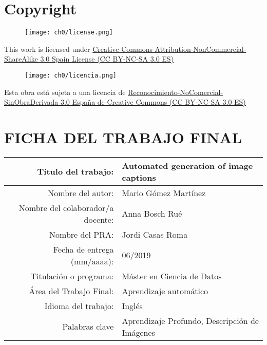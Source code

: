 \setcounter{page}{1} 
\pagestyle{plain}

\chapter*{Copyright}

\vspace{1cm}

\begin{figure}[ht]
    \centering
	\texttt{[image: ch0/license.png]}
\end{figure}

This work is licensed under \href{https://creativecommons.org/licenses/by-nc-sa/3.0/es/deed.en}{Creative Commons Attribution-NonCommercial-ShareAlike 3.0 Spain License (CC BY-NC-SA 3.0 ES)} 

\vspace{1cm}

\begin{figure}[ht]
    \centering
	\texttt{[image: ch0/licencia.png]}
\end{figure}

Esta obra está sujeta a una licencia de \href{https://creativecommons.org/licenses/by-nc-sa/3.0/es/}{Reconocimiento-NoComercial-SinObraDerivada 3.0 España de Creative Commons (CC BY-NC-SA 3.0 ES)}


\chapter*{FICHA DEL TRABAJO FINAL}

\begin{table}[ht]
	\centering{}
	\renewcommand{\arraystretch}{2}
	\begin{tabular}{r | l}
		\hline
		Título del trabajo: & Automated generation of image captions\\
		\hline
        Nombre del autor: & Mario Gómez Martínez\\
		\hline
        Nombre del colaborador/a docente: & Anna Bosch Rué\\
		\hline
        Nombre del PRA: & Jordi Casas Roma\\
		\hline
        Fecha de entrega (mm/aaaa): & 06/2019\\
		\hline
        Titulación o programa: & Máster en Ciencia de Datos\\
		\hline
        Área del Trabajo Final: & Aprendizaje automático\\
		\hline
        Idioma del trabajo: & Inglés\\
		\hline
        Palabras clave & Aprendizaje Profundo, Descripción de Imágenes\\
		\hline
	\end{tabular}
\end{table}

